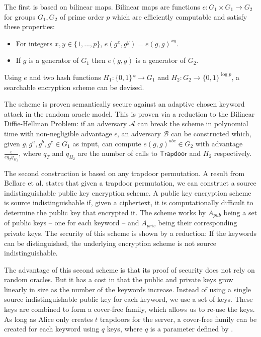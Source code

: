 \documentclass[a4paper,11pt]{article}
\begin{document}
    The first is based on bilinear maps. Bilinear maps are functions $e:G_1 \times G_1 \to G_2$ for groups $G_1, G_2$ of prime order $p$ which are efficiently computable and satisfy these properties:

    \begin{itemize}
        \item For integers $x, y \in \{1,...,p\}$, $e(g^x, g^y) = e(g, g)^{xy}$.
        \item If $g$ is a generator of $G_1$ then $e(g, g)$ is a generator of $G_2$.
    \end{itemize}

    Using $e$ and two hash functions $H_1: \{0, 1\}* \to G_1$ and $H_2: G_2 \to \{0, 1\}^{\log p}$, a searchable encryption scheme can be devised.

    The scheme is proven semantically secure against an adaptive chosen keyword attack in the random oracle model. This is proven via a reduction to the Bilinear Diffie-Hellman Problem: if an adversary $\mathcal{A}$ can break the scheme in polynomial time with non-negligible advantage $\epsilon$, an adversary $\mathcal{B}$ can be constructed which, given $g, g^a, g^b, g^c \in G_1$ as input, can compute $e(g, g)^{abc} \in G_2$ with advantage $\frac{\epsilon}{eq_Tq_{H_2}}$, where $q_T$ and $q_{H_2}$ are the number of calls to $\mathsf{Trapdoor}$ and $H_2$ respectively.

    The second construction is based on any trapdoor permutation. A result from Bellare et al. \cite{bellare:source} states that given a trapdoor permutation, we can construct a source indistinguishable public key encryption scheme. A public key encryption scheme is source indistinguishable if, given a ciphertext, it is computationally difficult to determine the public key that encrypted it. The scheme works by $A_{pub}$ being a set of public keys -- one for each keyword -- and $A_{priv}$ being their corresponding private keys. The security of this scheme is shown by a reduction: If the keywords can be distinguished, the underlying encryption scheme is not source indistinguishable.

    The advantage of this second scheme is that its proof of security does not rely on random oracles. But it has a cost in that the public and private keys grow linearly in size as the number of the keywords increase. Instead of using a single source indistinguishable public key for each keyword, we use a set of keys. These keys are combined to form a cover-free family, which allows us to re-use the keys. As long as Alice only creates $t$ trapdoors for the server, a cover-free family can be created for each keyword using $q$ keys, where $q$ is a parameter defined by \cite{du:cover-free-families}.
\end{document}
